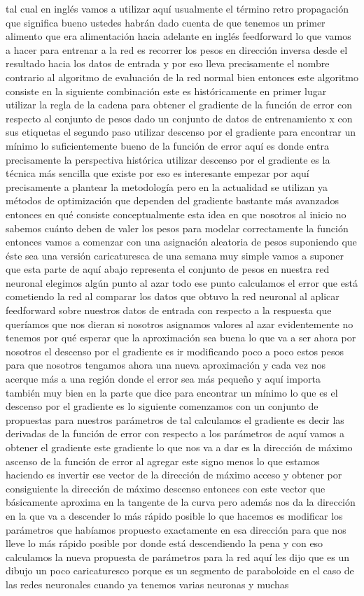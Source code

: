 tal cual en inglés vamos a utilizar aquí usualmente el término retro propagación que significa bueno ustedes habrán dado cuenta de que tenemos un primer alimento que era alimentación hacia adelante en inglés feedforward lo que vamos a hacer para entrenar a la red es recorrer los pesos en dirección inversa desde el resultado hacia los datos de entrada y por eso lleva precisamente el nombre contrario al algoritmo de evaluación de la red normal bien entonces este algoritmo consiste en la siguiente combinación este es históricamente en primer lugar utilizar la regla de la cadena para obtener el gradiente de la función de error con respecto al conjunto de pesos dado un conjunto de datos de entrenamiento x con sus etiquetas el segundo paso utilizar descenso por el gradiente para encontrar un mínimo lo suficientemente bueno de la función de error aquí es donde entra precisamente la perspectiva histórica utilizar descenso por el gradiente es la técnica más sencilla que existe por eso es interesante empezar por aquí precisamente a plantear la metodología pero en la actualidad se utilizan ya métodos de optimización que dependen del gradiente bastante más avanzados entonces en qué consiste conceptualmente esta idea en que nosotros al inicio no sabemos cuánto deben de valer los pesos para modelar correctamente la función entonces vamos a comenzar con una asignación aleatoria de pesos suponiendo que éste sea una versión caricaturesca de una semana muy simple vamos a suponer que esta parte de aquí abajo representa el conjunto de pesos en nuestra red neuronal elegimos algún punto al azar todo ese punto calculamos el error que está cometiendo la red al comparar los datos que obtuvo la red neuronal al aplicar feedforward sobre nuestros datos de entrada con respecto a la respuesta que queríamos que nos dieran si nosotros asignamos valores al azar evidentemente no tenemos por qué esperar que la aproximación sea buena lo que va a ser ahora por nosotros el descenso por el gradiente es ir modificando poco a poco estos pesos para que nosotros tengamos ahora una nueva aproximación y cada vez nos acerque más a una región donde el error sea más pequeño y aquí importa también muy bien en la parte que dice para encontrar un mínimo lo que es el descenso por el gradiente es lo siguiente comenzamos con un conjunto de propuestas para nuestros parámetros de tal calculamos el gradiente es decir las derivadas de la función de error con respecto a los parámetros de aquí vamos a obtener el gradiente este gradiente lo que nos va a dar es la dirección de máximo ascenso de la función de error al agregar este signo menos lo que estamos haciendo es invertir ese vector de la dirección de máximo acceso y obtener por consiguiente la dirección de máximo descenso entonces con este vector que básicamente aproxima en la tangente de la curva pero además nos da la dirección en la que va a descender lo más rápido posible lo que hacemos es modificar los parámetros que habíamos propuesto exactamente en esa dirección para que nos lleve lo más rápido posible por donde está descendiendo la pena y con eso calculamos la nueva propuesta de parámetros para la red aquí les dijo que es un dibujo un poco caricaturesco porque es un segmento de paraboloide en el caso de las redes neuronales cuando ya tenemos varias neuronas y muchas 